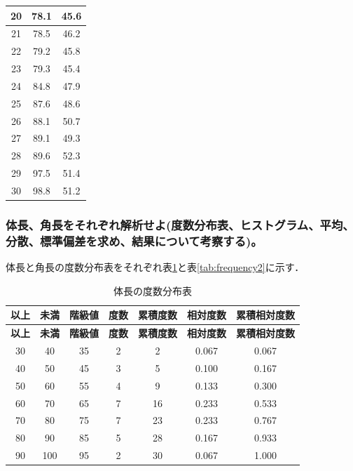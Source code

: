 \documentclass[titlepage,a4paper]{jsarticle}
\begin{document}
\begin{longtable}{|c|c|c|}
  20    & 78.1    & 45.6    \\ \hline
  21    & 78.5    & 46.2    \\ \hline
  22    & 79.2    & 45.8    \\ \hline
  23    & 79.3    & 45.4    \\ \hline
  24    & 84.8    & 47.9    \\ \hline
  25    & 87.6    & 48.6    \\ \hline
  26    & 88.1    & 50.7    \\ \hline
  27    & 89.1    & 49.3    \\ \hline
  28    & 89.6    & 52.3    \\ \hline
  29    & 97.5    & 51.4    \\ \hline
  30    & 98.8    & 51.2    \\ \hline
\end{longtable}
\subsubsection{体長、角長をそれぞれ解析せよ(度数分布表、ヒストグラム、平均、分散、標準偏差を求め、結果について考察する)。}\label{toi1_1_1}
体長と角長の度数分布表をそれぞれ表\ref{tab:frequency1}と表\ref{tab:frequency2}に示す．
\begin{longtable}{|c|c|c|c|c|c|c|}
  \caption{体長の度数分布表} \label{tab:frequency1}                                                                \\
  \hline
  \textbf{以上} & \textbf{未満} & \textbf{階級値} & \textbf{度数} & \textbf{累積度数} & \textbf{相対度数} & \textbf{累積相対度数} \\ \hline
  \endfirsthead
  \hline
  \textbf{以上} & \textbf{未満} & \textbf{階級値} & \textbf{度数} & \textbf{累積度数} & \textbf{相対度数} & \textbf{累積相対度数} \\ \hline
  \endhead
  30          & 40          & 35           & 2           & 2             & 0.067         & 0.067           \\ \hline
  40          & 50          & 45           & 3           & 5             & 0.100         & 0.167           \\ \hline
  50          & 60          & 55           & 4           & 9             & 0.133         & 0.300           \\ \hline
  60          & 70          & 65           & 7           & 16            & 0.233         & 0.533           \\ \hline
  70          & 80          & 75           & 7           & 23            & 0.233         & 0.767           \\ \hline
  80          & 90          & 85           & 5           & 28            & 0.167         & 0.933           \\ \hline
  90          & 100         & 95           & 2           & 30            & 0.067         & 1.000           \\ \hline
\end{longtable}
\end{document}
